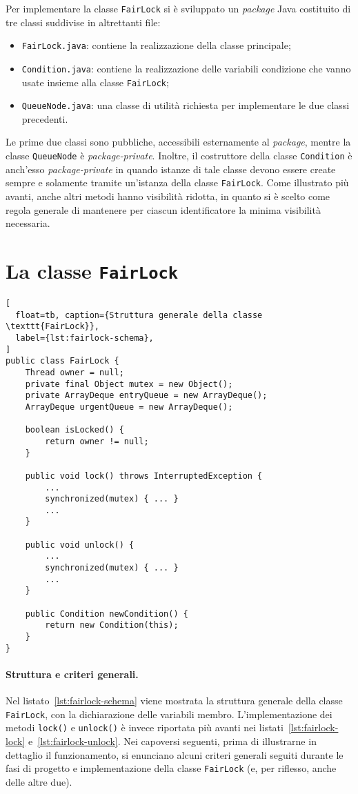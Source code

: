 \documentclass[a4paper,twoside]{article}
\newcommand\code{\lstinline[basicstyle=\normalsize\ttfamily]}
\begin{document}
Per implementare la classe \code|FairLock| si è sviluppato un \emph{package} Java costituito di tre classi suddivise in altrettanti file:
\begin{itemize}
\item \code|FairLock.java|: contiene la realizzazione della classe principale;
\item \code|Condition.java|: contiene la realizzazione delle variabili condizione che vanno usate insieme alla classe \code|FairLock|;
\item \code|QueueNode.java|: una classe di utilità richiesta per implementare le due classi precedenti.
\end{itemize}

Le prime due classi sono pubbliche, accessibili esternamente al \emph{package}, mentre la classe \code|QueueNode| è \emph{package-private}. Inoltre, il costruttore della classe \code|Condition| è anch'esso \emph{package-private} in quando istanze di tale classe devono essere create sempre e solamente tramite un'istanza della classe \code|FairLock|. Come illustrato più avanti, anche altri metodi hanno visibilità ridotta, in quanto si è scelto come regola generale di mantenere per ciascun identificatore la minima visibilità necessaria.



\section{La classe \texttt{FairLock}}

\begin{lstlisting}[
  float=tb, caption={Struttura generale della classe \texttt{FairLock}},
  label={lst:fairlock-schema},
]
public class FairLock {
	Thread owner = null;
	private final Object mutex = new Object();
	private ArrayDeque entryQueue = new ArrayDeque();
	ArrayDeque urgentQueue = new ArrayDeque();

	boolean isLocked() {
		return owner != null;
	}

	public void lock() throws InterruptedException {
		...
		synchronized(mutex) { ... }
		...
	}

	public void unlock() {
		...
		synchronized(mutex) { ... }
		...
	}

	public Condition newCondition() {
		return new Condition(this);
	}
}
\end{lstlisting}

\paragraph{Struttura e criteri generali.}
Nel listato~\ref{lst:fairlock-schema} viene mostrata la struttura generale della classe \code|FairLock|, con la dichiarazione delle variabili membro. L'implementazione dei metodi \code|lock()| e \code|unlock()| è invece riportata più avanti nei listati~\ref{lst:fairlock-lock} e~\ref{lst:fairlock-unlock}. Nei capoversi seguenti, prima di illustrarne in dettaglio il funzionamento, si enunciano alcuni criteri generali seguiti durante le fasi di progetto e implementazione della classe \code|FairLock| (e, per riflesso, anche delle altre due).
\end{document}
